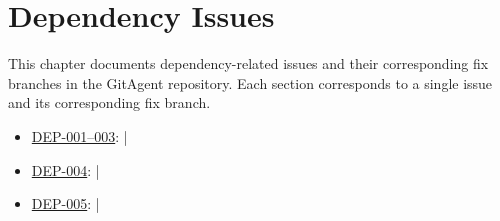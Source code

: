 \chapter{Dependency Issues}
\label{chap:dep}

This chapter documents dependency-related issues and their corresponding fix branches in the GitAgent repository. Each section corresponds to a single issue and its corresponding fix branch.

\begin{itemize}
    \item \hyperref[sec:dep-001-003]{DEP-001--003}:  | 
    \item \hyperref[sec:dep-004]{DEP-004}:  | 
    \item \hyperref[sec:dep-005]{DEP-005}:  | 
\end{itemize}






